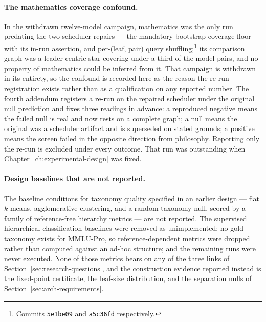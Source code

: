 \paragraph{The mathematics coverage confound.} In the withdrawn
twelve-model campaign, mathematics was the only run predating the two
scheduler repairs --- the mandatory bootstrap coverage floor with its
in-run assertion, and per-(leaf, pair) query
shuffling;\footnote{Commits \texttt{5e1be09} and \texttt{a5c36fd}
respectively.} its comparison graph was a leader-centric star covering
under a third of the model pairs, and no property of mathematics could
be inferred from it. That campaign is withdrawn in its entirety, so
the confound is recorded here as the reason the re-run registration
exists rather than as a qualification on any reported number. The
fourth addendum registers a re-run on the repaired scheduler under the
original null prediction and fixes three readings in advance: a
reproduced negative means the failed null is real and now rests on a
complete graph; a null means the original was a scheduler artifact and
is superseded on stated grounds; a positive means the screen failed in
the opposite direction from philosophy. Reporting only the re-run is
excluded under every outcome. That run was outstanding when
Chapter~\ref{ch:experimental-design} was fixed.

\paragraph{Design baselines that are not reported.} The baseline
conditions for taxonomy quality specified in an earlier design ---
flat $k$-means, agglomerative clustering, and a random taxonomy null,
scored by a family of reference-free hierarchy metrics --- are not
reported. The supervised hierarchical-classification baselines were
removed as unimplemented; no gold taxonomy exists for MMLU-Pro, so
reference-dependent metrics were dropped rather than computed against
an ad-hoc structure; and the remaining runs were never executed. None
of those metrics bears on any of the three links of
Section~\ref{sec:research-questions}, and the construction evidence
reported instead is the fixed-point certificate, the leaf-size
distribution, and the separation nulls of
Section~\ref{sec:arch-requirements}.

